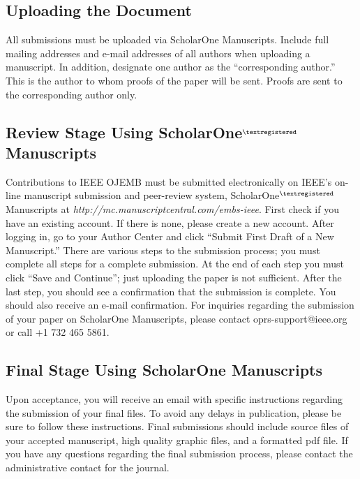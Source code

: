 \documentclass[journal]{IEEEtran}
\begin{document}
{
\subsection{Uploading the Document}
All submissions must be uploaded via ScholarOne Manuscripts. Include full mailing addresses and e-mail addresses of all authors when uploading a manuscript. In addition, designate one author as the “corresponding author.” This is the author to whom proofs of the paper will be sent. Proofs are sent to the corresponding author only.

\subsection{Review Stage Using ScholarOne$^{\tiny\textregistered}$ Manuscripts}
Contributions to IEEE OJEMB must be submitted electronically on IEEE’s on-line manuscript submission and peer-review system, ScholarOne$^{\tiny\textregistered}$ Manuscripts at \textit{http://mc.manuscriptcentral.com/embs-ieee}. First check if you have an existing account. If there is none, please create a new account. After logging in, go to your Author Center and click “Submit First Draft of a New Manuscript.” 
There are various steps to the submission process; you must complete all steps for a complete submission. At the end of each step you must click “Save and Continue”; just uploading the paper is not sufficient. After the last step, you should see a confirmation that the submission is complete. You should also receive an e-mail confirmation. For inquiries regarding the submission of your paper on ScholarOne Manuscripts, please contact oprs-support@ieee.org or call +1 732 465 5861.

\subsection{Final Stage Using ScholarOne Manuscripts}
Upon acceptance, you will receive an email with specific instructions regarding the submission of your final files.  To avoid any delays in publication, please be sure to follow these instructions.  Final submissions should include source files of your accepted manuscript, high quality graphic files, and a formatted pdf file.  If you have any questions regarding the final submission process, please contact the administrative contact for the journal. 
}
\end{document}
